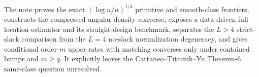 The note proves the exact \((\log n/n)^{1/4}\) primitive and smooth-class frontiers, constructs the compressed angular-density converse, exposes a data-driven full-location estimator and its straight-design benchmark, separates the \(L>4\) strict-slack comparison from the \(L=4\) no-slack normalization degeneracy, and gives conditional order-\(m\) upper rates with matching converses only under contained bumps and \(m\geq q\).  It explicitly leaves the Cattaneo--Titiunik--Yu Theorem-6 same-class question unresolved.
